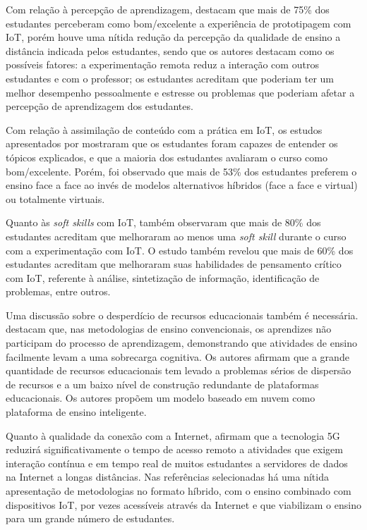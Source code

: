 \documentclass[portuguese]{textolivre}
\begin{document}
Com relação à percepção de aprendizagem, \textcite{fortoul-diaz_project-based_2021} destacam que mais de 75\% dos estudantes perceberam como bom/excelente a experiência de prototipagem com IoT, porém houve uma nítida redução da percepção da qualidade de ensino a distância indicada pelos estudantes, sendo que os autores destacam como os possíveis fatores: a experimentação remota reduz a interação com outros estudantes e com o professor; os estudantes acreditam que poderiam ter um melhor desempenho pessoalmente e estresse ou problemas que poderiam afetar a percepção de aprendizagem dos estudantes. 

Com relação à assimilação de conteúdo com a prática em IoT, os estudos apresentados por \textcite{fortoul-diaz_project-based_2021} mostraram que os estudantes foram capazes de entender os tópicos explicados, e que a maioria dos estudantes avaliaram o curso como bom/excelente. Porém, foi observado que mais de 53\% dos estudantes preferem o ensino face a face ao invés de modelos alternativos híbridos (face a face e virtual) ou totalmente virtuais. 

Quanto às \textit{soft skills} com IoT, \textcite{fortoul-diaz_project-based_2021} também observaram que mais de 80\% dos estudantes acreditam que melhoraram ao menos uma \textit{soft skill} durante o curso com a experimentação com IoT. O estudo também revelou que mais de 60\% dos estudantes acreditam que melhoraram suas habilidades de pensamento crítico com IoT, referente à análise, sintetização de informação, identificação de problemas, entre outros. 

Uma discussão sobre o desperdício de recursos educacionais também é necessária. \textcite{liu_internet_2021} destacam que, nas metodologias de ensino convencionais, os aprendizes não participam do processo de aprendizagem, demonstrando que atividades de ensino facilmente levam a uma sobrecarga cognitiva. Os autores afirmam que a grande quantidade de recursos educacionais tem levado a problemas sérios de dispersão de recursos e a um baixo nível de construção redundante de plataformas educacionais. Os autores propõem um modelo baseado em nuvem como plataforma de ensino inteligente. 

Quanto à qualidade da conexão com a Internet, \textcite{lin_construction_2019} afirmam que a tecnologia 5G reduzirá significativamente o tempo de acesso remoto a atividades que exigem interação contínua e em tempo real de muitos estudantes a servidores de dados na Internet a longas distâncias. Nas referências selecionadas há uma nítida apresentação de metodologias no formato híbrido, com o ensino combinado com dispositivos IoT, por vezes acessíveis através da Internet e que viabilizam o ensino para um grande número de estudantes.
\end{document}
